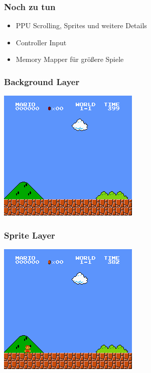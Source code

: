 \documentclass{beamer}
\begin{document}
    \begin{frame}
        \frametitle{Noch zu tun}
        \begin{itemize}
            \item{PPU Scrolling, Sprites und weitere Details}
            \item{Controller Input}
            \item{Memory Mapper für größere Spiele}
        \end{itemize}
    \end{frame}
    
    
    \begin{frame}
        \frametitle{Background Layer}
        \includegraphics[width=0.8\linewidth]{img/smb_bg.png}
    \end{frame}
    
    
    \begin{frame}
        \frametitle{Sprite Layer}
        \includegraphics[width=0.8\linewidth]{img/smb_sprite.png}
    \end{frame}
    
\end{document}
